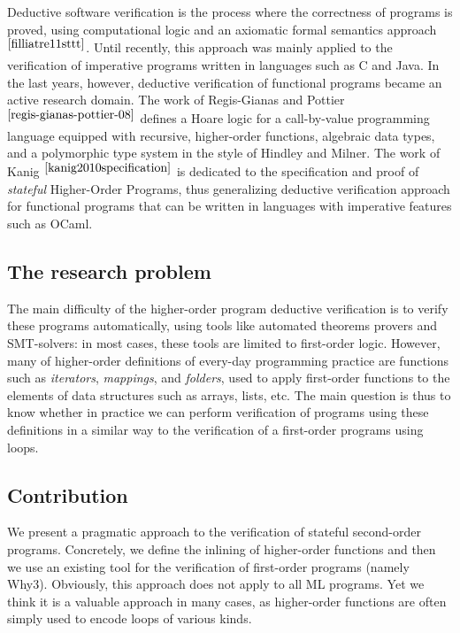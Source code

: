 \documentclass[a4paper,11pt,oneside]{article}
\theoremstyle{plain}
\begin{document}
Deductive software verification is the process where the correctness
of programs is proved, using computational logic and an axiomatic
formal semantics approach$^{\cite{filliatre11sttt}}$.  Until recently,
this approach was mainly applied to the verification of imperative
programs written in languages such as C and Java.  In the last years,
however, deductive verification of functional programs became an
active research domain.  The work of Regis-Gianas and
Pottier$^{\cite{regis-gianas-pottier-08}}$ defines a Hoare logic for a
call-by-value programming language equipped with recursive,
higher-order functions, algebraic data types, and a polymorphic type
system in the style of Hindley and Milner.  The work of
Kanig$^{~\cite{kanig2010specification}}$ is dedicated to the
specification and proof of \textit{stateful} Higher-Order Programs,
thus generalizing deductive verification approach for functional
programs that can be written in languages with imperative features
such as OCaml.

\subsection*{The research problem}
The main difficulty of the higher-order program deductive verification
is to verify these programs automatically, using tools like automated
theorems provers and SMT-solvers: in most cases, these tools are
limited to first-order logic.  However, many of higher-order
definitions of every-day programming practice are functions such as
\textit{iterators}, \textit{mappings}, and \textit{folders},
used to apply first-order functions to the elements
of data structures such as arrays, lists, etc.  The main question
is thus to know whether in practice we can perform verification of programs
using these definitions in a similar way to the verification of a
first-order programs using loops.

\subsection*{Contribution}

We present a pragmatic approach to the verification of stateful
second-order programs.
Concretely, we define the inlining of higher-order functions and then
we use an existing tool for the verification of first-order programs
(namely Why3). Obviously, this approach does not apply to all ML
programs. Yet we think it is a valuable approach in many cases, as
higher-order functions are often simply used to encode loops of
various kinds.
\end{document}
